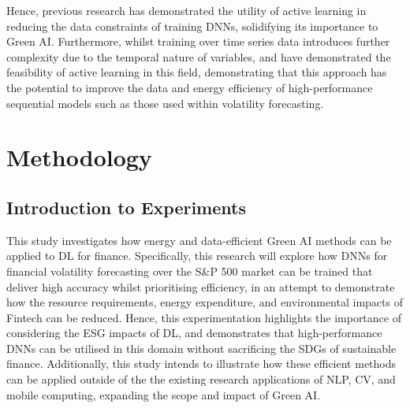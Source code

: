 \documentclass[a4paper, 11pt]{report}
\begin{document}
    Hence, previous research has demonstrated the utility of active learning in reducing the data constraints of training DNNs, solidifying its importance to Green AI. Furthermore, whilst training over time series data introduces further complexity due to the temporal nature of variables, \citet{peng-2017} and \citet{zimmer-2018} have demonstrated the feasibility of active learning in this field, demonstrating that this approach has the potential to improve the data and energy efficiency of high-performance sequential models such as those used within volatility forecasting.


    \newpage
    \chapter{Methodology}
    \label{chapter: experiments}

    \section{Introduction to Experiments}

    This study investigates how energy and data-efficient Green AI methods can be applied to DL for finance. Specifically, this research will explore how DNNs for financial volatility forecasting over the S\&P 500 market can be trained that deliver high accuracy whilst prioritising efficiency, in an attempt to demonstrate how the resource requirements, energy expenditure, and environmental impacts of Fintech can be reduced. Hence, this experimentation highlights the importance of considering the ESG impacts of DL, and demonstrates that high-performance DNNs can be utilised in this domain without sacrificing the SDGs of sustainable finance. Additionally, this study intends to illustrate how these efficient methods can be applied outside of the the existing research applications of NLP, CV, and mobile computing, expanding the scope and impact of Green AI.
\end{document}
